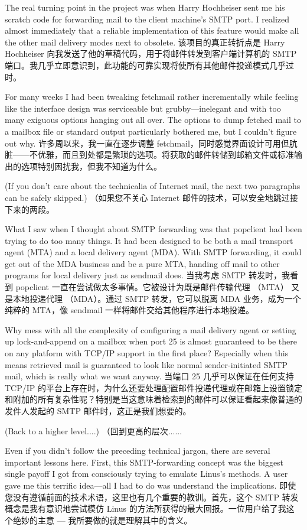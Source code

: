 \documentclass[a4paper,12pt,UTF8,twoside]{ctexbook}
\begin{document}
The real turning point in the project was when Harry Hochheiser sent me his scratch code for forwarding mail to the client machine's SMTP port. I realized almost immediately that a reliable implementation of this feature would make all the other mail delivery modes next to obsolete.
该项目的真正转折点是 Harry Hochheiser 向我发送了他的草稿代码，用于将邮件转发到客户端计算机的 SMTP 端口。我几乎立即意识到，此功能的可靠实现将使所有其他邮件投递模式几乎过时。

For many weeks I had been tweaking fetchmail rather incrementally while feeling like the interface design was serviceable but grubby—inelegant and with too many exiguous options hanging out all over. The options to dump fetched mail to a mailbox file or standard output particularly bothered me, but I couldn't figure out why.
许多周以来，我一直在逐步调整 fetchmail，同时感觉界面设计可用但肮脏——不优雅，而且到处都是繁琐的选项。将获取的邮件转储到邮箱文件或标准输出的选项特别困扰我，但我不知道为什么。

(If you don't care about the technicalia of Internet mail, the next two paragraphs can be safely skipped.)
（如果您不关心 Internet 邮件的技术，可以安全地跳过接下来的两段。

What I saw when I thought about SMTP forwarding was that popclient had been trying to do too many things. It had been designed to be both a mail transport agent (MTA) and a local delivery agent (MDA). With SMTP forwarding, it could get out of the MDA business and be a pure MTA, handing off mail to other programs for local delivery just as sendmail does.
当我考虑 SMTP 转发时，我看到 popclient 一直在尝试做太多事情。它被设计为既是邮件传输代理 （MTA） 又是本地投递代理 （MDA）。通过 SMTP 转发，它可以脱离 MDA 业务，成为一个纯粹的 MTA，像 sendmail 一样将邮件交给其他程序进行本地投递。

Why mess with all the complexity of configuring a mail delivery agent or setting up lock-and-append on a mailbox when port 25 is almost guaranteed to be there on any platform with TCP/IP support in the first place? Especially when this means retrieved mail is guaranteed to look like normal sender-initiated SMTP mail, which is really what we want anyway.
当端口 25 几乎可以保证在任何支持 TCP/IP 的平台上存在时，为什么还要处理配置邮件投递代理或在邮箱上设置锁定和附加的所有复杂性呢？特别是当这意味着检索到的邮件可以保证看起来像普通的发件人发起的 SMTP 邮件时，这正是我们想要的。

(Back to a higher level....)
（回到更高的层次......

Even if you didn't follow the preceding technical jargon, there are several important lessons here. First, this SMTP-forwarding concept was the biggest single payoff I got from consciously trying to emulate Linus's methods. A user gave me this terrific idea—all I had to do was understand the implications.
即使您没有遵循前面的技术术语，这里也有几个重要的教训。首先，这个 SMTP 转发概念是我有意识地尝试模仿 Linus 的方法所获得的最大回报。一位用户给了我这个绝妙的主意 — 我所要做的就是理解其中的含义。
\end{document}
